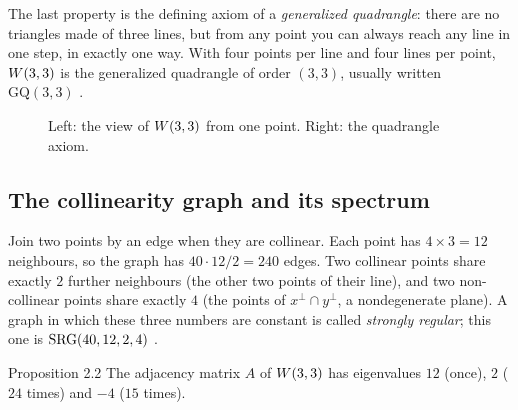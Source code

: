 The last property is the defining axiom of a \emph{generalized quadrangle}: there are no
triangles made of three lines, but from any point you can always reach any line in one
step, in exactly one way. With four points per line and four lines per point, $W(3,3)$ is
the generalized quadrangle of order $(3,3)$, usually written $\mathrm{GQ}(3,3)$ \cite{PayneThas}.

\begin{figure}[htbp]
\centering
{}
\caption{Left: the view of $W(3,3)$ from one point. Right: the quadrangle axiom.}
\label{fig:pencil}
\end{figure}

\subsection{The collinearity graph and its spectrum}

Join two points by an edge when they are collinear. Each point has $4\times3=12$
neighbours, so the graph has $40\cdot12/2=240$ edges. Two collinear points share exactly
$2$ further neighbours (the other two points of their line), and two non-collinear points
share exactly $4$ (the points of $x^\perp\cap y^\perp$, a nondegenerate plane). A graph in
which these three numbers are constant is called \emph{strongly regular}; this one is
$\mathrm{SRG}(40,12,2,4)$ \cite{BvM}.

\begin{result}{Proposition 2.2 \hfill \tierT}
The adjacency matrix $A$ of $W(3,3)$ has eigenvalues $12$ (once), $2$ ($24$ times) and $-4$
($15$ times).
\end{result}

